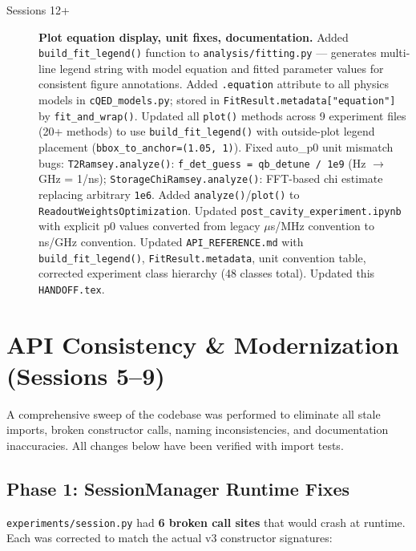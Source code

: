 \documentclass[11pt]{article}
\begin{document}
\begin{description}
  \item[Sessions 12+] \textbf{Plot equation display, unit fixes, documentation.}
        Added \texttt{build\_fit\_legend()} function to \texttt{analysis/fitting.py} --- generates
        multi-line legend string with model equation and fitted parameter values for
        consistent figure annotations.
        Added \texttt{.equation} attribute to all physics models in \texttt{cQED\_models.py};
        stored in \texttt{FitResult.metadata["equation"]} by \texttt{fit\_and\_wrap()}.
        Updated all \texttt{plot()} methods across 9 experiment files (20+ methods) to use
        \texttt{build\_fit\_legend()} with outside-plot legend placement
        (\texttt{bbox\_to\_anchor=(1.05, 1)}).
        Fixed auto\_p0 unit mismatch bugs:
        \texttt{T2Ramsey.analyze()}: \texttt{f\_det\_guess = qb\_detune / 1e9} (Hz $\rightarrow$ GHz = 1/ns);
        \texttt{StorageChiRamsey.analyze()}: FFT-based chi estimate replacing arbitrary \texttt{1e6}.
        Added \texttt{analyze()}/\texttt{plot()} to \texttt{ReadoutWeightsOptimization}.
        Updated \texttt{post\_cavity\_experiment.ipynb} with explicit p0 values converted
        from legacy $\mu$s/MHz convention to ns/GHz convention.
        Updated \texttt{API\_REFERENCE.md} with \texttt{build\_fit\_legend()}, \texttt{FitResult.metadata},
        unit convention table, corrected experiment class hierarchy (48 classes total).
        Updated this \texttt{HANDOFF.tex}.
\end{description}

\section{API Consistency \& Modernization (Sessions 5--9)}
\label{sec:api-modernization}

A comprehensive sweep of the codebase was performed to eliminate all stale
imports, broken constructor calls, naming inconsistencies, and documentation
inaccuracies.  All changes below have been verified with import tests.

\subsection{Phase 1: SessionManager Runtime Fixes}

\texttt{experiments/session.py} had \textbf{6 broken call sites} that would
crash at runtime.  Each was corrected to match the actual v3 constructor
signatures:
\end{document}
